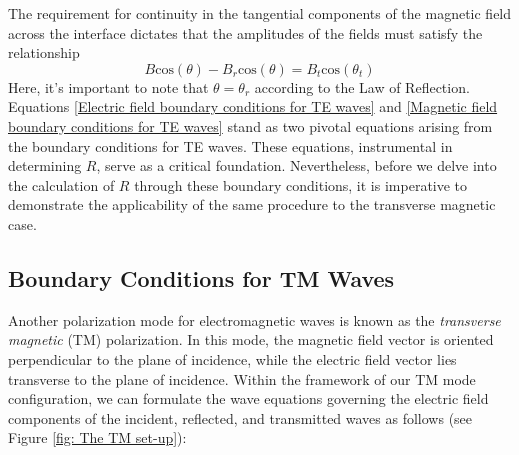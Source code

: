 The requirement for continuity in the tangential components of the magnetic field across the interface dictates that the amplitudes of the fields must satisfy the relationship
\begin{equation} \label{Magnetic field boundary conditions for TE waves}
B\mathrm{cos}(\theta) - B_r\mathrm{cos}(\theta) = B_t\mathrm{cos}(\theta_t) 
\end{equation}
Here, it's important to note that $\theta = \theta_r$ according to the Law of Reflection. Equations \ref{Electric field boundary conditions for TE waves} and \ref{Magnetic field boundary conditions for TE waves} stand as two pivotal equations arising from the boundary conditions for TE waves. These equations, instrumental in determining $R$, serve as a critical foundation. Nevertheless, before we delve into the calculation of $R$ through these boundary conditions, it is imperative to demonstrate the applicability of the same procedure to the transverse magnetic case.

\subsection{Boundary Conditions for TM Waves}
Another polarization mode for electromagnetic waves is known as the \textit{transverse magnetic} (TM) polarization. In this mode, the magnetic field vector is oriented perpendicular to the plane of incidence, while the electric field vector lies transverse to the plane of incidence. Within the framework of our TM mode configuration, we can formulate the wave equations governing the electric field components of the incident, reflected, and transmitted waves as follows (see Figure \ref{fig: The TM set-up}):

